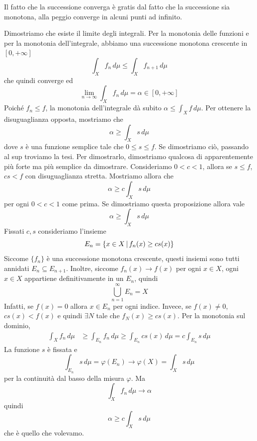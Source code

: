 \documentclass[a4paper]{article}
\begin{document}
\begin{radioactive}
Il fatto che la successione converga è gratis dal fatto
che la successione sia monotona, alla peggio converge in alcuni punti ad infinito.
\end{radioactive}

\begin{radioactive}
\begin{snippetproof}{}
    Dimostriamo che esiste il limite degli integrali.
    Per la monotonia delle funzioni e per la monotonia dell'integrale, abbiamo una successione
    monotona crescente in \([0,+\infty]\)
    \[
        \int_X f_n\,d\mu \leq \int_X f_{n+1}\,d\mu
    \]
    che quindi converge ed
    \[
        \lim_{n\to\infty}\int_Xf_n\,d\mu=\alpha \in [0,+\infty]
    \]
    Poiché \(f_n\leq f\), la monotonia dell'integrale dà subito
    \(\alpha\leq\int_X f\,d\mu\). Per ottenere la disuguaglianza opposta,
    mostriamo che
    \[
        \alpha \geq \int_X s\,d\mu
    \]
    dove \(s\) è una funzione semplice tale che \(0 \leq s \leq f\).
    Se dimostriamo ciò, passando al sup troviamo la tesi.
    Per dimostrarlo, dimostriamo qualcosa di apparentemente più forte ma più semplice da dimostrare.
    Consideriamo \(0 < c < 1\), allora se \(s \leq f\), \(cs < f\)
    con disuguaglianza stretta. Mostriamo allora che
    \[
        \alpha \geq c \int_X s\,d\mu
    \]
    per ogni \(0 < c < 1\) come prima. Se dimostriamo questa proposizione
    allora vale \[
        \alpha\geq\int_Xs\,d\mu
    \]
    Fissati \(c,s\) consideriamo l'insieme \[
        E_n = \{
            x \in X \,|\, f_n(x) \geq cs(x)
        \}
    \]
    Siccome \(\{f_n\}\) è una successione monotona crescente, questi insiemi sono tutti annidati
    \(E_n\subseteq E_{n+1}\). Inoltre,
    siccome \(f_n(x) \to f(x)\) per ogni \(x \in X\), ogni \(x\in X\) appartiene definitivamente in un \(E_n\), quindi
    \[
        \bigcup_{n=1}^\infty E_n = X
    \]
    Infatti, se \(f(x)=0\) allora \(x \in E_n\) per ogni indice.
    Invece, se \(f(x) \neq 0\), \(cs(x) < f(x)\) e quindi \(\exists N\)
    tale che \(f_N(x)\geq cs(x)\).
    Per la monotonia sul dominio,
    \begin{align*}
        \int_X f_n \,d\mu &\geq \int_{E_n}f_n\,d\mu \geq \int_{E_n} cs(x)\,d\mu = c \int_{E_n} s\,d\mu
    \end{align*}
    La funzione \(s\) è fissata e
    \[
        \int_{E_n} s\,d\mu = \varphi(E_n) \to \varphi(X) = \int_X s \,d\mu
    \]
    per la continuità dal basso della misura \(\varphi\).
    Ma \[
        \int_X f_n\,d\mu \to \alpha
    \]
    quindi
    \[
        \alpha \geq c \int_X s\,d\mu
    \]
    che è quello che volevamo.
\end{snippetproof}
\end{radioactive}
\end{document}
